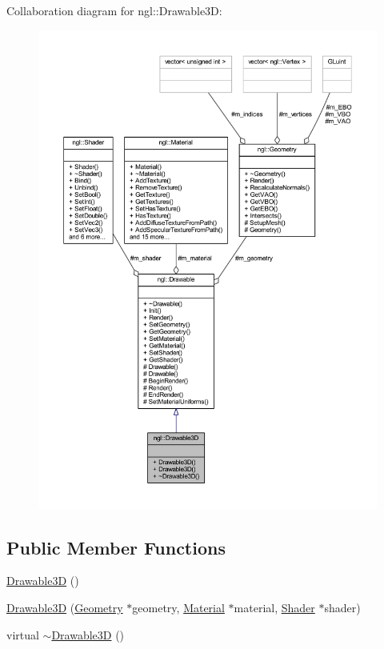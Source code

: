 Collaboration diagram for ngl\+:\+:Drawable3D\+:
\nopagebreak
\begin{figure}[H]
\begin{center}
\leavevmode
\includegraphics[width=350pt]{classngl_1_1_drawable3_d__coll__graph}
\end{center}
\end{figure}
\subsection*{Public Member Functions}
\begin{DoxyCompactItemize}
\item 
\mbox{\hyperlink{classngl_1_1_drawable3_d_aae58fdd01a433a383c72d45254444df0}{Drawable3D}} ()
\item 
\mbox{\hyperlink{classngl_1_1_drawable3_d_a83e551fb4b952afa0bdd6b0704682434}{Drawable3D}} (\mbox{\hyperlink{classngl_1_1_geometry}{Geometry}} $\ast$geometry, \mbox{\hyperlink{classngl_1_1_material}{Material}} $\ast$material, \mbox{\hyperlink{classngl_1_1_shader}{Shader}} $\ast$shader)
\item 
virtual \mbox{\hyperlink{classngl_1_1_drawable3_d_a8f47486f9d8a8ed14562df6c2727287f}{$\sim$\+Drawable3D}} ()
\end{DoxyCompactItemize}

